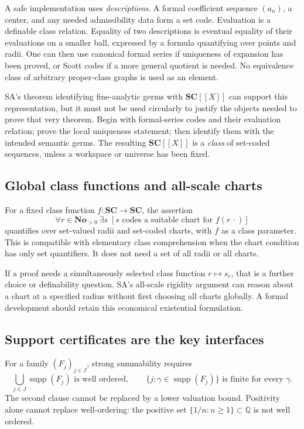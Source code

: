 \documentclass[11pt,letterpaper]{article}
\theoremstyle{definition}
\theoremstyle{remark}
\newcommand{\No}{\mathbf{No}}
\newcommand{\SC}{\mathbf{SC}}
\newcommand{\Q}{\mathbb Q}
\newcommand{\supp}{\operatorname{supp}}
\numberwithin{equation}{section}
\begin{document}
A safe implementation uses \emph{descriptions}. A formal coefficient sequence \((a_n)\), a center, and any needed admissibility data form a set code. Evaluation is a definable class relation. Equality of two descriptions is eventual equality of their evaluations on a smaller ball, expressed by a formula quantifying over points and radii. One can then use canonical formal series if uniqueness of expansion has been proved, or Scott codes if a more general quotient is needed. No equivalence class of arbitrary proper-class graphs is used as an element.

SA's theorem identifying fine-analytic germs with \(\SC[[X]]\) can support this representation, but it must not be used circularly to justify the objects needed to prove that very theorem. Begin with formal-series codes and their evaluation relation; prove the local uniqueness statement; then identify them with the intended semantic germs. The resulting \(\SC[[X]]\) is a \emph{class} of set-coded sequences, unless a workspace or universe has been fixed.

\subsection{Global class functions and all-scale charts}
For a fixed class function \(f:\SC\to\SC\), the assertion
\[
 \forall r\in\No_{>0}\ \exists s\;
 [s\text{ codes a suitable chart for }f(r\,\cdot)]
\]
quantifies over set-valued radii and set-coded charts, with \(f\) as a class parameter. This is compatible with elementary class comprehension when the chart condition has only set quantifiers. It does not need a set of all radii or all charts.

If a proof needs a simultaneously selected class function \(r\mapsto s_r\), that is a further choice or definability question. SA's all-scale rigidity argument can reason about a chart at a specified radius without first choosing all charts globally. A formal development should retain this economical existential formulation.

\subsection{Support certificates are the key interfaces}
For a family \((F_j)_{j\in J}\), strong summability requires
\begin{equation}\label{eq:strongconditions}
 \bigcup_{j\in J}\supp(F_j)\text{ is well ordered},\qquad
 \{j:\gamma\in\supp(F_j)\}\text{ is finite for every }\gamma.
\end{equation}
The second clause cannot be replaced by a lower valuation bound. Positivity alone cannot replace well-ordering: the positive set \(\{1/n:n\ge1\}\subset\Q\) is not well ordered.
\end{document}
